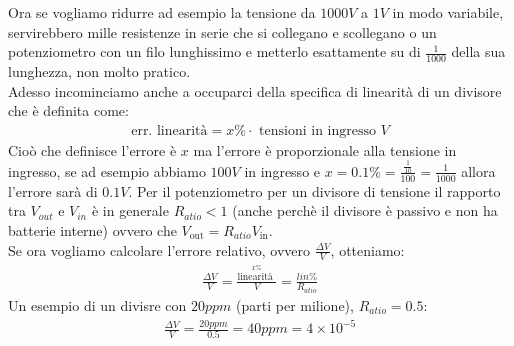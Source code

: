 \documentclass[a4paper, oneside]{article}
\begin{document}
Ora se vogliamo ridurre ad esempio la tensione da $1000 V$ a $1 V$ in modo variabile, servirebbero mille resistenze in serie che si collegano e scollegano o un potenziometro con un filo lunghissimo e metterlo esattamente su di $\frac{1}{1000}$ della sua lunghezza, non molto pratico.\\
Adesso incominciamo anche a occuparci della specifica di linearità di un divisore che è definita come:
\begin{gather*}
    \text{err. linearità} = x \% \cdot \text{ tensioni in ingresso } V
\end{gather*}
Cioò che definisce l'errore è $x$ ma l'errore è proporzionale alla tensione in ingresso, se ad esempio abbiamo $100V$ in ingresso e $x= 0.1\% = \frac{\frac{1}{10}}{100} = \frac{1}{1000}$ allora l'errore sarà di $0.1V$.
Per il potenziometro per un divisore di tensione il rapporto tra $V_{out}$ e $V_{in}$ è in generale $R_{atio} < 1$ (anche perchè il divisore è passivo e non ha batterie interne) ovvero che $V_\text{out} = R_{atio} V_\text{in}$.\\
Se ora vogliamo calcolare l'errore relativo, ovvero $\frac{\Delta V}{V}$, otteniamo:
\begin{gather*}
    \frac{\Delta V}{V} = \frac{\overset{x \%}{\text{linearità }}}{V} = \frac{lin \%}{R_{atio}}
\end{gather*}
Un esempio di un divisre con $20 ppm$ (parti per milione), $R_{atio}=0.5$:
\begin{gather*}
    \frac{\Delta V}{V} = \frac{20 ppm}{0.5} = 40 ppm = 4 \times 10^{-5}
\end{gather*}
\end{document}
